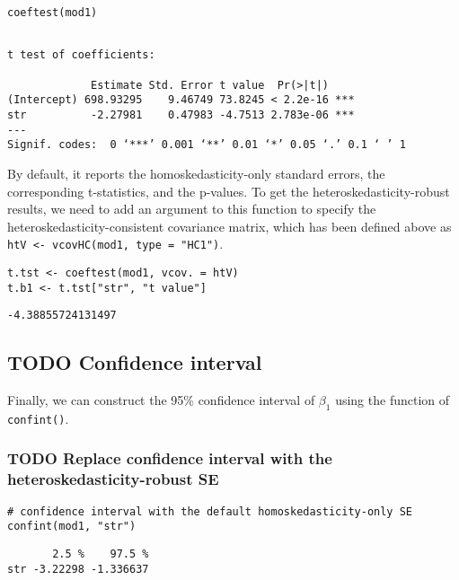 \documentclass[11pt]{article}
\begin{document}
\begin{verbatim}
coeftest(mod1)
\end{verbatim}

\begin{verbatim}

t test of coefficients:

             Estimate Std. Error t value  Pr(>|t|)
(Intercept) 698.93295    9.46749 73.8245 < 2.2e-16 ***
str          -2.27981    0.47983 -4.7513 2.783e-06 ***
---
Signif. codes:  0 ‘***’ 0.001 ‘**’ 0.01 ‘*’ 0.05 ‘.’ 0.1 ‘ ’ 1
\end{verbatim}

By default, it reports the homoskedasticity-only standard errors,
the corresponding t-statistics, and the p-values. To get the
heteroskedasticity-robust results, we need to add an argument to this
function to specify the heteroskedasticity-consistent covariance
matrix, which has been defined above as \texttt{htV <- vcovHC(mod1, type = "HC1")}.

\begin{verbatim}
t.tst <- coeftest(mod1, vcov. = htV)
t.b1 <- t.tst["str", "t value"]
\end{verbatim}

\begin{verbatim}
-4.38855724131497
\end{verbatim}


\subsection{{\bfseries\sffamily TODO} Confidence interval}
\label{sec:org2ce76b3}

Finally, we can construct the 95\% confidence interval of \(\beta_1\)
using the function of \texttt{confint()}.


\subsubsection*{{\bfseries\sffamily TODO} Replace confidence interval with the heteroskedasticity-robust SE}
\label{sec:org7eb83b4}

\begin{verbatim}
# confidence interval with the default homoskedasticity-only SE
confint(mod1, "str")
\end{verbatim}

\begin{verbatim}
       2.5 %    97.5 %
str -3.22298 -1.336637
\end{verbatim}
\end{document}
